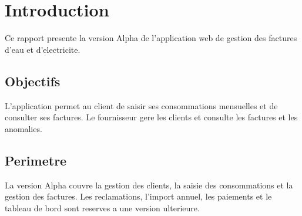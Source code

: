 \section{Introduction}

Ce rapport presente la version Alpha de l'application web de gestion des factures d'eau et d'electricite.

\subsection{Objectifs}

L'application permet au client de saisir ses consommations mensuelles et de consulter ses factures. Le fournisseur gere les clients et consulte les factures et les anomalies.

\subsection{Perimetre}

La version Alpha couvre la gestion des clients, la saisie des consommations et la gestion des factures. Les reclamations, l'import annuel, les paiements et le tableau de bord sont reserves a une version ulterieure.

